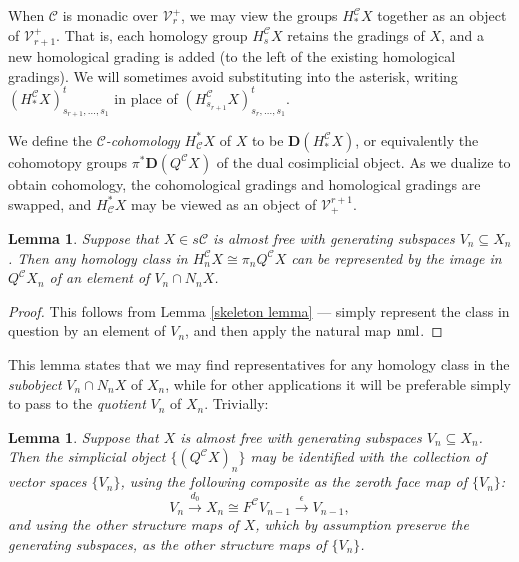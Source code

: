 \documentclass[11pt]{amsart} \renewcommand{\baselinestretch}{1.2}
\theoremstyle{plain}
\newtheorem{lem}[thm]{Lemma}
\numberwithin{equation}{section} %
\theoremstyle{plain}
\newtheorem{lem}[thm]{Lemma}
\numberwithin{equation}{chapter} %
\renewcommand{\to}{\longrightarrow}
\newcommand{\calV}{\mathcal{V}}
\newcommand{\calc}{\mathcal{C}}
\newcommand{\vect}[2]{\calV^{#1}_{#2}}
\newcommand{\epi}{{\,\makebox[0cm][l]{\ensuremath\to}\to{}}}
\newcommand{\dual}{\mathbf{D}}
\begin{document}
\begin{Conventions and notation}
When $\calc$ is monadic over $\vect{+}{r}$, we may view the groups $H_*^{\calc}X$ together as an object of $\vect{+}{r+1}$. That is, each homology group $H_s^\calc X$ retains the gradings of $X$, and a new homological grading is added (to the left of the existing homological gradings). We will sometimes avoid substituting into the asterisk, writing  $(H_*^\calc X)_{s_{r+1},\ldots,s_1}^t$ in place of $(H_{s_{r+1}}^\calc X)_{s_r,\ldots,s_1}^t$.

We define the \emph{$\calc$-cohomology} $H^*_\calc X$ of $X$ to be $\dual(H_*^\calc X)$, or equivalently the cohomotopy groups $\pi^*\dual(Q^\calc X)$ of the dual cosimplicial object.  As we dualize to obtain cohomology, the cohomological gradings and homological gradings are swapped, and $H^*_{\calc}X$ may be viewed as an object of $\vect{r+1}{+}$. 


\begin{lem}
\label{lemma on homology class repd by normalized generator}
Suppose that $X\in s\calc$ is almost free with generating subspaces $V_n\subseteq X_n$. Then any homology class in $H_n^{\calc}X\cong \pi_nQ^{\calc}X$ can be represented by the image in $Q^{\calc}X_n$ of an element of $V_n\cap N_nX$.
\end{lem}
\begin{proof}
This follows from Lemma \ref{skeleton lemma} --- simply represent the class in question by an element of $V_n$, and then apply the natural map $\textup{nml}$. %
\end{proof}
\noindent This lemma states that we may find representatives for any homology class in the \emph{subobject} $V_n\cap N_nX$ of $X_n$, while for other applications it will be preferable simply to pass to the \emph{quotient} $V_n$ of $X_n$. Trivially: %
\begin{lem}
\label{identify almost free indecs with gens}
Suppose that $X$ is almost free with generating subspaces $V_n\subseteq X_n$. Then the simplicial object $\{(Q^{\calc}X)_{n}\}$ may be identified with the collection of vector spaces $\{V_n\}$, using  the following composite as the zeroth face map of $\{V_n\}$:
\[V_{n}\overset{d_0}{\to}X_n\cong F^{\calc}V_{n-1}\overset{\epsilon}{\to}V_{n-1},\]
and using the other structure maps of $X$, which by assumption preserve the generating subspaces, as the other structure maps of $\{V_n\}$.
\end{lem}




\end{Conventions and notation}
\end{document}
